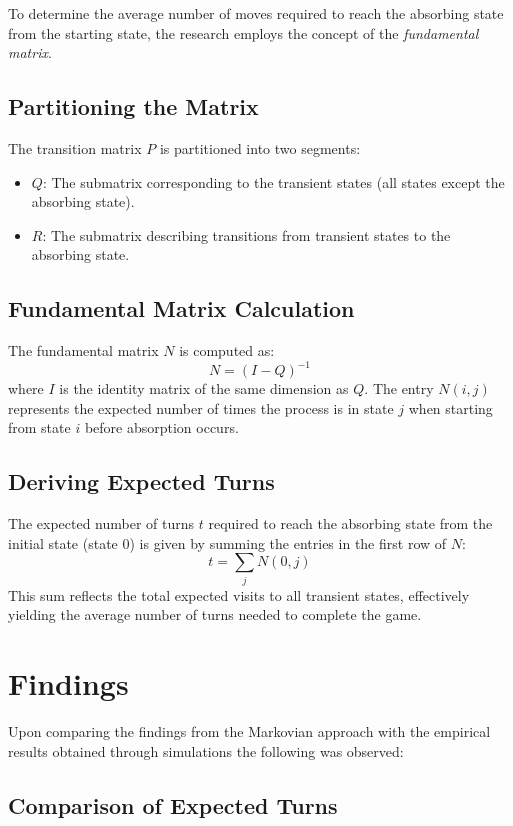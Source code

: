 To determine the average number of moves required to reach the absorbing state from the starting state, the research employs the concept of the \textit{fundamental matrix}.

\subsection{Partitioning the Matrix}

The transition matrix $P$ is partitioned into two segments:
\begin{itemize}
	\item $Q$: The submatrix corresponding to the transient states (all states except the absorbing state).
	\item $R$: The submatrix describing transitions from transient states to the absorbing state.
\end{itemize}

\subsection{Fundamental Matrix Calculation}

The fundamental matrix $N$ is computed as:
\[
N = (I - Q)^{-1}
\]
where $I$ is the identity matrix of the same dimension as $Q$. The entry $N(i, j)$ represents the expected number of times the process is in state $j$ when starting from state $i$ before absorption occurs.

\subsection{Deriving Expected Turns}

The expected number of turns $t$ required to reach the absorbing state from the initial state (state 0) is given by summing the entries in the first row of $N$:
\[
t = \sum_{j} N(0, j)
\]
This sum reflects the total expected visits to all transient states, effectively yielding the average number of turns needed to complete the game.

\section{Findings}
Upon comparing the findings from the Markovian approach with the empirical results obtained through simulations the following was observed:

\subsection{Comparison of Expected Turns}

